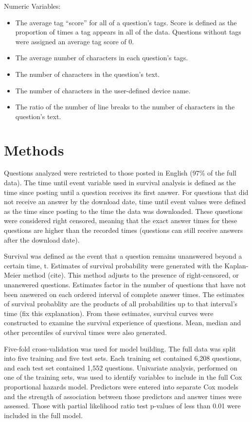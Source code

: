 \documentclass[12pt]{article}
\begin{document}
Numeric Variables:

\begin{itemize}
  \item The average tag ``score'' for all of a question's tags. Score is defined as the proportion of times a tag appears in all of the data. Questions without tags were assigned an average tag score of 0. 
  \item The average number of characters in each question's tags. 
  \item The number of characters in the question's text. 
  \item The number of characters in the user-defined device name. 
  \item The ratio of the number of line breaks to the number of characters in the question's text.
\end{itemize}


\section{Methods}

    Questions analyzed were restricted to those posted in English (97\% of the full data). The time until event variable used in survival analysis is defined as the time since posting until a question receives its first answer. For questions that did not receive an answer by the download date, time until event values were defined as the time since posting to the time the data was downloaded. These questions were considered right censored, meaning that the exact answer times for these questions are higher than the recorded times (questions can still receive answers after the download date). 

Survival was defined as the event that a question remains unanswered beyond a certain time, t. Estimates of survival probability were generated with the Kaplan-Meier method (cite). This method adjusts to the presence of right-censored, or unanswered questions. Estimates factor in the number of questions that have not been answered on each ordered interval of complete answer times. The estimates of survival probablity are the products of all probabilities up to that interval's time (fix this explanation). From these estimates, survival curves were constructed to examine the survival experience of questions. Mean, median and other percentiles of survival times were also generated. 

Five-fold cross-validation was used for model building. The full data was split into five training and five test sets. Each training set contained 6,208 questions, and each test set contained 1,552 questions. Univariate analysis, performed on one of the training sets, was used to identify variables to include in the full Cox proportional hazards model. Predictors were entered into separate Cox models and the strength of association between those predictors and answer times were assessed. Those with partial likelihood ratio test p-values of less than 0.01 were included in the full model.
\end{document}
